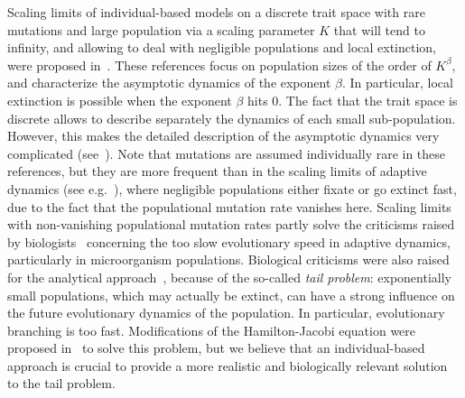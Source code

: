 \documentclass[10pt]{amsart}
\theoremstyle{plain}
\theoremstyle{remark}
\begin{document}
Scaling limits of individual-based models on a discrete trait space with rare mutations and large population via a scaling parameter $K$ that will tend to infinity, and allowing to deal with negligible populations and local extinction, were proposed in~\cite{durrettmayberry,Bovier2019,champagnatmeleardtran2021,coquille2021,blathpaultobias}. These references focus on population sizes of the order of $K^\beta$, and characterize the asymptotic dynamics of the exponent $\beta$. In particular, local extinction is possible when the exponent $\beta$ hits 0. The fact that the trait space is discrete allows to describe separately the dynamics of each small sub-population.
However, this makes the detailed description of the
asymptotic dynamics very complicated (see~\cite{champagnatmeleardtran2021,coquille2021}).
Note that mutations are assumed individually rare in these references, but they are more frequent than in the scaling limits of adaptive dynamics (see e.g.~\cite{metzgeritzmeszenajacobsheerwaarden,dieckmannlaw,champagnat06,champagnatmeleard2011}), where negligible populations either fixate or go extinct fast, due to the fact that the populational mutation rate vanishes here.
Scaling limits with non-vanishing populational mutation rates partly solve the criticisms raised by biologists~\cite{WaxmanGavrilets2005} concerning the too slow evolutionary speed in adaptive dynamics, particularly in microorganism populations. Biological criticisms were also raised for the analytical approach~\cite{perthame2010}, because
of the so-called {\it tail problem}: exponentially small populations, which may actu\-ally be extinct, can have a strong influence on the future evolutionary dynamics of the population. In particular, evolutionary branching is too fast.
Modifications of the Hamilton-Jacobi equation were proposed in~{\cite{perthame2010,Mirrahimi2012,jabin2012}} to solve this problem, but we believe that an individual-based approach is crucial to provide a more realistic and biologically relevant solution to the tail problem.
\end{document}
